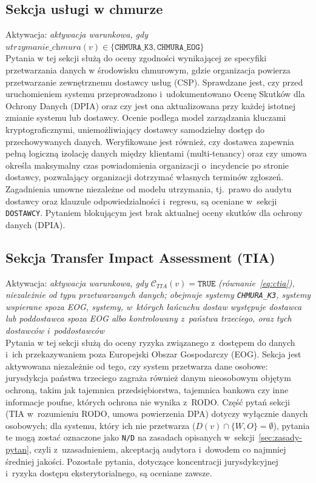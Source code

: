 \subsection{Sekcja usługi w chmurze}
\noindent Aktywacja: \textit{aktywacja warunkowa, gdy} $\textit{utrzymanie\_chmura}(v) \in \{\texttt{CHMURA\_K3}, \texttt{CHMURA\_EOG}\}$\\
Pytania w tej sekcji służą do oceny zgodności wynikającej ze specyfiki przetwarzania danych w środowisku chmurowym, gdzie organizacja powierza przetwarzanie zewnętrznemu dostawcy usług (CSP). Sprawdzane jest, czy przed uruchomieniem systemu przeprowadzono i~udokumentowano Ocenę Skutków dla Ochrony Danych (DPIA) oraz czy jest ona aktualizowana przy każdej istotnej zmianie systemu lub dostawcy. Ocenie podlega model zarządzania kluczami kryptograficznymi, uniemożliwiający dostawcy samodzielny dostęp do przechowywanych danych. Weryfikowane jest również, czy dostawca zapewnia pełną logiczną izolację danych między klientami (multi-tenancy) oraz czy umowa określa maksymalny czas powiadomienia organizacji o~incydencie po stronie dostawcy, pozwalający organizacji dotrzymać własnych terminów zgłoszeń. Zagadnienia umowne niezależne od modelu utrzymania, tj.\ prawo do audytu dostawcy oraz klauzule odpowiedzialności i~regresu, są oceniane w~sekcji \texttt{DOSTAWCY}. Pytaniem blokującym jest brak aktualnej oceny skutków dla ochrony danych (DPIA).

\subsection{Sekcja Transfer Impact Assessment (TIA)}
\noindent Aktywacja: \textit{aktywacja warunkowa, gdy} $\mathcal{C}_{TIA}(v) = \texttt{TRUE}$ \textit{(równanie~\eqref{eq:ctia}), niezależnie od typu przetwarzanych danych; obejmuje systemy \texttt{CHMURA\_K3}, systemy wspierane spoza EOG, systemy, w~których łańcuchu dostaw występuje dostawca lub poddostawca spoza EOG albo kontrolowany z~państwa trzeciego, oraz tych dostawców i~poddostawców}\\
Pytania w tej sekcji służą do oceny ryzyka związanego z~dostępem do danych i~ich przekazywaniem poza Europejski Obszar Gospodarczy (EOG). Sekcja jest aktywowana niezależnie od tego, czy system przetwarza dane osobowe: jurysdykcja państwa trzeciego zagraża również danym nieosobowym objętym ochroną, takim jak tajemnica przedsiębiorstwa, tajemnica bankowa czy inne informacje poufne, których ochrona nie wynika z~RODO. Część pytań sekcji (TIA w~rozumieniu RODO, umowa powierzenia DPA) dotyczy wyłącznie danych osobowych; dla systemu, który ich nie przetwarza ($D(v) \cap \{W, O\} = \emptyset$), pytania te mogą zostać oznaczone jako \texttt{N/D} na zasadach opisanych w~sekcji~\ref{sec:zasady-pytan}, czyli z~uzasadnieniem, akceptacją audytora i~dowodem co najmniej średniej jakości. Pozostałe pytania, dotyczące koncentracji jurysdykcyjnej i~ryzyka dostępu eksterytorialnego, są oceniane zawsze.

